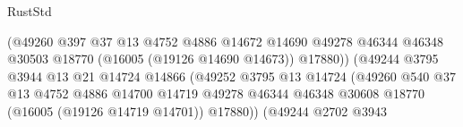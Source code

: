 \begin{lexlean}{RustStd}
\begin{coremodule}
                                                  (@49260
                                                    @397
                                                    @37
                                                    @13
                                                    @4752
                                                    @4886
                                                    @14672
                                                    @14690
                                                    @49278
                                                    @46344
                                                    @46348
                                                    @30503
                                                    @18770
                                                    (@16005 (@19126 @14690 @14673))
                                                    @17880))
                                                (@49244
                                                  @3795
                                                  @3944
                                                  @13
                                                  @21
                                                  @14724
                                                  @14866
                                                  (@49252
                                                    @3795
                                                    @13
                                                    @14724
                                                    (@49260
                                                      @540
                                                      @37
                                                      @13
                                                      @4752
                                                      @4886
                                                      @14700
                                                      @14719
                                                      @49278
                                                      @46344
                                                      @46348
                                                      @30608
                                                      @18770
                                                      (@16005 (@19126 @14719 @14701))
                                                      @17880))
                                                  (@49244
                                                    @2702
                                                    @3943

\end{coremodule}
\end{lexlean}
